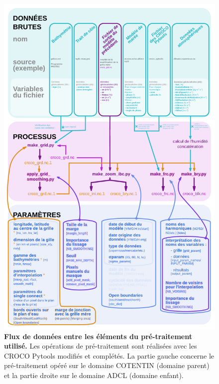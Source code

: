 \documentclass[10pt,a4paper,titlepage]{article}
\begin{document}
\begin{figure}[H]
\begin{center}
        \includegraphics[scale=0.35]{../images/workflow/graphe_prepro_fille_new.pdf}
        \caption{
            \textbf{
            Flux de données entre les éléments du pré-traitement utilisé.
            }
            Les opérations de pré-traitement sont réalisées avec les CROCO Pytools modifiés et complétés.
            La partie gauche concerne le pré-traitement opéré sur le domaine COTENTIN ({\color{workColor}domaine parent}) et la partie droite sur le domaine ADCL ({\color{orange}domaine enfant}).
}
\end{center}
\end{figure}
\end{document}
